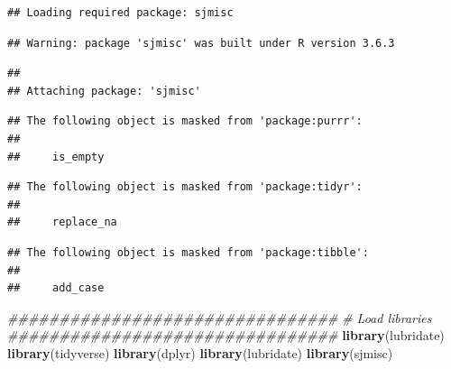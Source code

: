\documentclass[]{article}
\newenvironment{Shaded}{\begin{snugshade}}{\end{snugshade}}
\newcommand{\CommentTok}[1]{\textcolor[rgb]{0.56,0.35,0.01}{\textit{#1}}}
\newcommand{\KeywordTok}[1]{\textcolor[rgb]{0.13,0.29,0.53}{\textbf{#1}}}
\newcommand{\NormalTok}[1]{#1}
\begin{document}
\begin{verbatim}
## Loading required package: sjmisc
\end{verbatim}

\begin{verbatim}
## Warning: package 'sjmisc' was built under R version 3.6.3
\end{verbatim}

\begin{verbatim}
## 
## Attaching package: 'sjmisc'
\end{verbatim}

\begin{verbatim}
## The following object is masked from 'package:purrr':
## 
##     is_empty
\end{verbatim}

\begin{verbatim}
## The following object is masked from 'package:tidyr':
## 
##     replace_na
\end{verbatim}

\begin{verbatim}
## The following object is masked from 'package:tibble':
## 
##     add_case
\end{verbatim}

\begin{Shaded}
\begin{Highlighting}[]
\CommentTok{################################}
\CommentTok{# Load libraries}
\CommentTok{################################}
\KeywordTok{library}\NormalTok{(lubridate)}
\KeywordTok{library}\NormalTok{(tidyverse)}
\KeywordTok{library}\NormalTok{(dplyr)}
\KeywordTok{library}\NormalTok{(lubridate)}
\KeywordTok{library}\NormalTok{(sjmisc)}
\end{Highlighting}
\end{Shaded}
\end{document}

